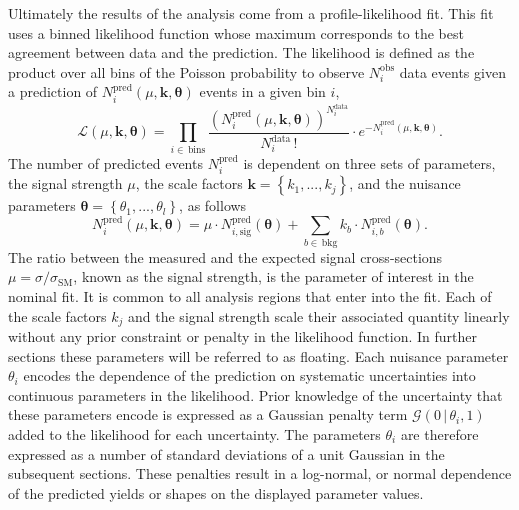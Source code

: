 Ultimately the results of the analysis come from a profile-likelihood fit. This
fit uses a binned likelihood function whose maximum corresponds to the best
agreement between data and the prediction. The likelihood is defined as the
product over all bins of the Poisson probability to observe $N^{\text{obs}}_i$
data events given a prediction of $N^{\text{pred}}_i(\mu,\bm{k},{\bm\theta})$
events in a given bin $i$,
\begin{equation} \mathcal{L}(\mu,{\bm{k},\bm{\theta}}) =
\prod_{i\in\,\text{bins}} \frac{\left( N_{i}^{\text{pred}}(\mu,{\bm{k,\theta}})
\right)^{N_{i}^{\text{data}}}}{N_{i}^{\text{data}}\,!} \cdot
e^{-N_{i}^{\text{pred}}(\mu,{\bm{k,\theta}})}.
  \label{eq:likelihood}
\end{equation} The number of predicted events $N^{\text{pred}}_i$ is dependent
on three sets of parameters, the signal strength $\mu$, the scale factors
$\bm{k}=\left\{k_1, ...,k_j\right\}$, and the nuisance parameters $\bm{\theta} =
\left\{\theta_1,...,\theta_l\right\}$, as follows
\begin{equation} N_{i}^{\text{pred}}(\mu,\bm{k},\bm{\theta}) = \mu \cdot
N_{i,\text{sig}}^{\text{pred}}(\bm{\theta}) + \sum_{b\in\,\text{bkg}} k_b\cdot
N_{i,b}^{\text{pred}}(\bm{\theta}).
\end{equation} The ratio between the measured and the expected signal
cross-sections $\mu=\sigma/\sigma_{\text{SM}}$, known as the signal strength, is
the parameter of interest in the nominal fit. It is common to all analysis
regions that enter into the fit. Each of the scale factors $k_j$ and the signal
strength scale their associated quantity linearly without any prior
constraint or penalty in the likelihood function. In further sections these
parameters will be referred to as floating. Each nuisance parameter $\theta_i$
encodes the dependence of the prediction on systematic uncertainties into
continuous parameters in the likelihood. Prior knowledge of the uncertainty that
these parameters encode is expressed as a Gaussian penalty term
$\mathcal{G}(0\,|\,\theta_i,1)$ added to the likelihood for each uncertainty.
The parameters $\theta_i$ are therefore expressed as a number of standard
deviations of a unit Gaussian in the subsequent sections. These penalties
result in a log-normal, or normal dependence of the predicted yields or shapes
on the displayed parameter values.


